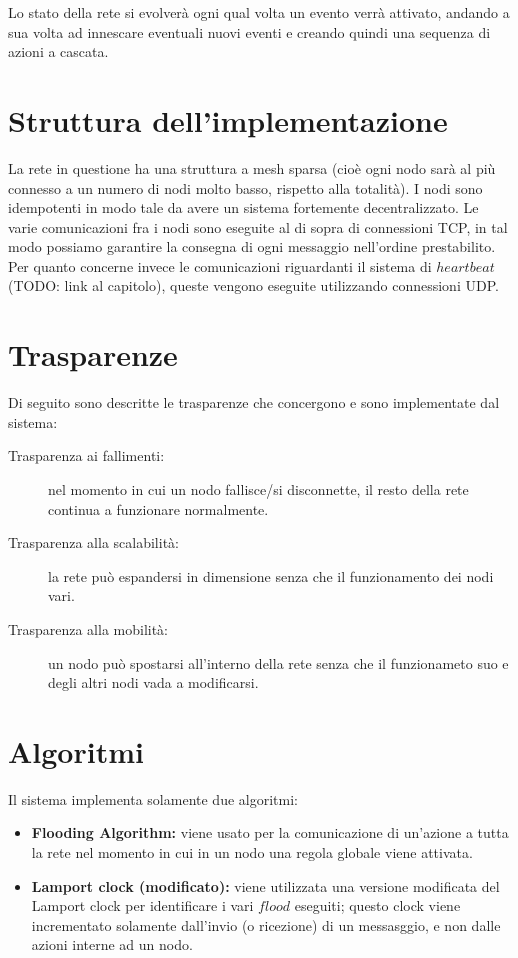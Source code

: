 \documentclass{memoir}
\begin{document}
Lo stato della rete si evolverà ogni qual volta un evento verrà attivato, andando a sua volta ad innescare eventuali nuovi eventi e creando quindi una sequenza di azioni a cascata.

\section{Struttura dell'implementazione}

La rete in questione ha una struttura a mesh sparsa (cioè ogni nodo sarà al più connesso a un numero di nodi molto basso, rispetto alla totalità).
I nodi sono idempotenti in modo tale da avere un sistema fortemente decentralizzato.
Le varie comunicazioni fra i nodi sono eseguite al di sopra di connessioni TCP, in tal modo possiamo garantire la consegna di ogni messaggio nell'ordine prestabilito.
Per quanto concerne invece le comunicazioni riguardanti il sistema di $heartbeat$ (TODO: link al capitolo), queste vengono eseguite utilizzando connessioni UDP.

\section{Trasparenze}\label{Trasparenze}

Di seguito sono descritte le trasparenze che concergono e sono implementate dal sistema:

\begin{description} 
\item[Trasparenza ai fallimenti:] nel momento in cui un nodo fallisce/si disconnette, il resto della rete continua a funzionare normalmente.
\item[Trasparenza alla scalabilità:] la rete può espandersi in dimensione senza che il funzionamento dei nodi vari.
\item[Trasparenza alla mobilità:] un nodo può spostarsi all'interno della rete senza che il funzionameto suo e degli altri nodi vada a modificarsi.
\end{description}

\section{Algoritmi}

Il sistema implementa solamente due algoritmi:
\begin{itemize}
\item \textbf{Flooding Algorithm:} viene usato per la comunicazione di un'azione a tutta la rete nel momento in cui in un nodo una regola globale viene attivata.
\item \textbf{Lamport clock (modificato):} viene utilizzata una versione modificata del Lamport clock per identificare i vari $flood$ eseguiti; questo clock viene incrementato solamente dall'invio (o ricezione) di un messasggio, e non dalle azioni interne ad un nodo.
\end{itemize}
\end{document}
